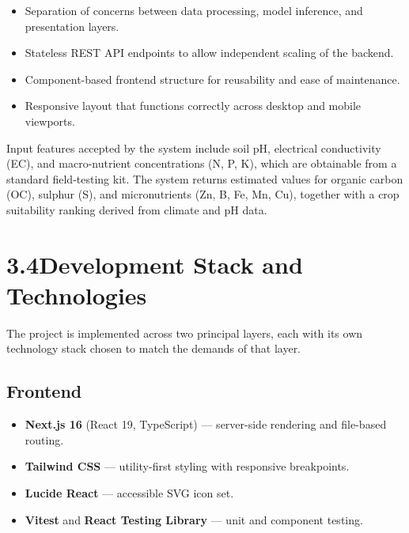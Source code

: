 \documentclass[12pt,a4paper]{article}
\begin{document}
\begin{itemize}
  \item Separation of concerns between data processing, model inference, and
        presentation layers.
  \item Stateless REST API endpoints to allow independent scaling of the
        backend.
  \item Component-based frontend structure for reusability and ease of
        maintenance.
  \item Responsive layout that functions correctly across desktop and mobile
        viewports.
\end{itemize}

Input features accepted by the system include soil pH, electrical conductivity
(EC), and macro-nutrient concentrations (N, P, K), which are obtainable from a
standard field-testing kit.  The system returns estimated values for organic
carbon (OC), sulphur (S), and micronutrients (Zn, B, Fe, Mn, Cu), together
with a crop suitability ranking derived from climate and pH data.

\section{3.4\quad Development Stack and Technologies}

The project is implemented across two principal layers, each with its own
technology stack chosen to match the demands of that layer.

\subsection*{Frontend}
\begin{itemize}
  \item \textbf{Next.js 16} (React 19, TypeScript) --- server-side rendering
        and file-based routing.
  \item \textbf{Tailwind CSS} --- utility-first styling with responsive
        breakpoints.
  \item \textbf{Lucide React} --- accessible SVG icon set.
  \item \textbf{Vitest} and \textbf{React Testing Library} --- unit and
        component testing.
\end{itemize}
\end{document}
